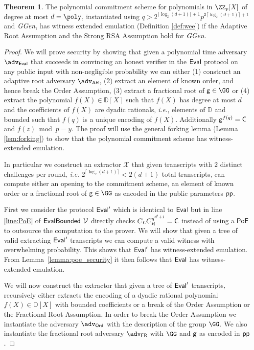 \documentclass{article}
\theoremstyle{definition}
\newtheorem{theorem}{Theorem}
\begin{document}
\begin{theorem}
	The polynomial commitment scheme for polynomials in $\ZZ_p[X]$ of degree at most $d=\poly$, instantiated using $q>2^{\lceil \log_2(d+1) \rceil+1} p^{3 \lceil \log_2(d+1) \rceil+1}$ and $\textit{GGen}$, has witness extended emulation (Definition \ref{def:wee}) if the Adaptive Root Assumption and the Strong RSA Assumption hold for $\textit{GGen}$.
\end{theorem}

\begin{proof}
We will prove security by showing that given a polynomial time adversary $\adv_{\eval}$ that succeeds in convincing an honest verifier in the $\textsf{{Eval}}$ protocol on any public input with non-negligible probability we can either (1) construct an adaptive root adversary $\adv_{\textsf{AR}}$, (2) extract an element of known order, and hence break the Order Assumption, (3) extract a fractional root of $\gr{g}\in \GG$ or (4) extract the polynomial $f(X)\in \mathbb{D}[X]$ such that $f(X)$ has degree at most $d$ and the coefficients of $f(X)$ are dyadic rationals, \emph{i.e.}, elements of $\mathbb{D}$ and bounded such that $f(q)$ is a unique encoding of $f(X)$. Additionally $\mathsf{g}^{f(q)}=\mathsf{C}$ and $f(z) \bmod p=y$. The proof will use the general forking lemma (Lemma \ref{lem:forking}) to show that the polynomial commitment scheme has witness-extended emulation.

In particular we construct an extractor $\mathcal{X}$ that given transcripts with $2$ distinct challenges per round, \emph{i.e.} $2^{\lceil\log_2(d+1)\rceil}<2 (d+1)$ total transcripts, can compute either an opening to the commitment scheme, an element of known order or a fractional root of $\gr{g}\in\GG$ as encoded in the public parameters $\textsf{pp}$.

First we consider the protocol $\textsf{{Eval}}'$ which is identical to $\textsf{{Eval}}$ but in line \ref{line:PoE} of $\textsf{{EvalBounded}}$ $\mathcal{V}$ directly checks $C_LC_R^{q^{d'+1}}=\mathsf{C}$ instead of using a $\textsf{PoE}$ to outsource the computation to the prover. We will show that given a tree of valid extracting $\textsf{{Eval}}'$ transcripts we can compute a valid witness with overwhelming probability. This shows that $\textsf{{Eval}}'$ has witness-extended emulation. From Lemma~\ref{lemma:poe_security} it then follows that $\textsf{{Eval}}$ has witness-extended emulation.


We will now construct the extractor that given a tree of $\textsf{{Eval}}'$ transcripts, recursively either extracts the encoding of a dyadic rational polynomial $f(X)\in \mathbb{D}[X]$ with bounded coefficients or a break of the Order Assumption or the Fractional Root Assumption. In order to break the Order Assumption we instantiate the adversary $\adv_{\textsf{Ord}}$ with the description of the group $\GG$. We also instantiate the fractional root adversary $\adv_{\textsf{FR}}$ with $\GG$ and $\mathsf{g}$ as encoded in $\textsf{pp}$.


\end{proof}
\end{document}
